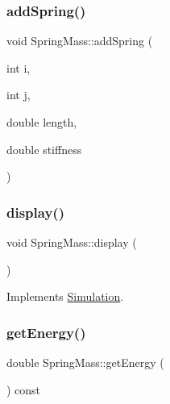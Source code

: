 \mbox{\label{classSpringMass_a61799a4987d64402de52f3772b68e8b2}} 
\subsubsection{\texorpdfstring{add\+Spring()}{addSpring()}}
{\footnotesize\ttfamily void Spring\+Mass\+::add\+Spring (\begin{DoxyParamCaption}\item[{int}]{i,  }\item[{int}]{j,  }\item[{double}]{length,  }\item[{double}]{stiffness }\end{DoxyParamCaption})}

\mbox{\label{classSpringMass_a97dc8e01e829e466198b3a8c201a5b13}} 
\subsubsection{\texorpdfstring{display()}{display()}}
{\footnotesize\ttfamily void Spring\+Mass\+::display (\begin{DoxyParamCaption}{ }\end{DoxyParamCaption})\hspace{0.3cm}{\ttfamily [virtual]}}



Implements \hyperlink{classSimulation_a6f8e5272dbb5dea34970f0695419ff03}{Simulation}.

\mbox{\label{classSpringMass_a1700091076aa83fff57fdec6876bf138}} 
\subsubsection{\texorpdfstring{get\+Energy()}{getEnergy()}}
{\footnotesize\ttfamily double Spring\+Mass\+::get\+Energy (\begin{DoxyParamCaption}{ }\end{DoxyParamCaption}) const}

\mbox{\label{classSpringMass_a187503b09da458570891a38612864e75}} 

